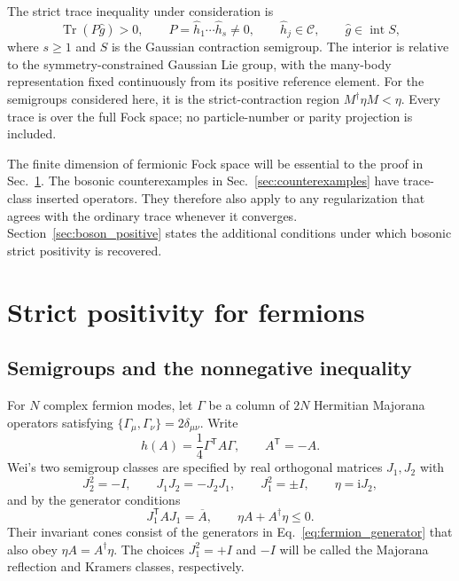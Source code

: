\documentclass[11pt,a4paper]{article}
\newcommand{\Tr}{\operatorname{Tr}}
\newcommand{\ii}{\mathrm i}
\newcommand{\trans}{\mathsf T}
\newcommand{\mc}[1]{\mathcal{#1}}
\newcommand{\interior}{\operatorname{int}}
\theoremstyle{remark}
\numberwithin{equation}{section}
\begin{document}
The strict trace inequality under consideration is
\begin{equation}
\Tr(P\hat g)>0,\qquad
P=\hat h_1\cdots\hat h_s\ne0,\qquad
\hat h_j\in\mc C,\qquad \hat g\in\interior S,
\label{eq:proposed_inequality}
\end{equation}
where \(s\geq1\) and \(S\) is the Gaussian contraction semigroup. The
interior is relative to the symmetry-constrained Gaussian Lie group, with
the many-body representation fixed continuously from its positive reference
element. For the semigroups considered here, it is the strict-contraction
region \(M^\dagger\eta M<\eta\). Every trace is over the full Fock space;
no particle-number or parity projection is included.

The finite dimension of fermionic Fock space will be essential to the proof
in Sec.~\ref{sec:fermions}. The bosonic counterexamples in
Sec.~\ref{sec:counterexamples} have trace-class inserted operators. They
therefore also apply to any regularization that agrees with the ordinary
trace whenever it converges. Section~\ref{sec:boson_positive} states the
additional conditions under which bosonic strict positivity is recovered.

\section{Strict positivity for fermions}
\label{sec:fermions}

\subsection{Semigroups and the nonnegative inequality}

For \(N\) complex fermion modes, let \(\Gamma\) be a column of \(2N\)
Hermitian Majorana operators satisfying
\(\{\Gamma_\mu,\Gamma_\nu\}=2\delta_{\mu\nu}\). Write
\begin{equation}
\hat h(A)=\frac14\Gamma^\trans A\Gamma,\qquad A^\trans=-A.
\label{eq:fermion_quadratic}
\end{equation}
Wei's two semigroup classes are specified by real orthogonal matrices
\(J_1,J_2\) with
\begin{equation}
J_2^2=-I,\qquad J_1J_2=-J_2J_1,\qquad J_1^2=\pm I,
\qquad \eta=\ii J_2,
\label{eq:fermion_symmetries}
\end{equation}
and by the generator conditions~\cite{wei2024prb}
\begin{equation}
J_1^\trans A J_1=\overline A,\qquad
\eta A+A^\dagger\eta\leq0.
\label{eq:fermion_generator}
\end{equation}
Their invariant cones consist of the generators in
Eq.~\eqref{eq:fermion_generator} that also obey
\(\eta A=A^\dagger\eta\). The choices \(J_1^2=+I\) and \(-I\) will be
called the Majorana reflection and Kramers classes, respectively.
\end{document}
